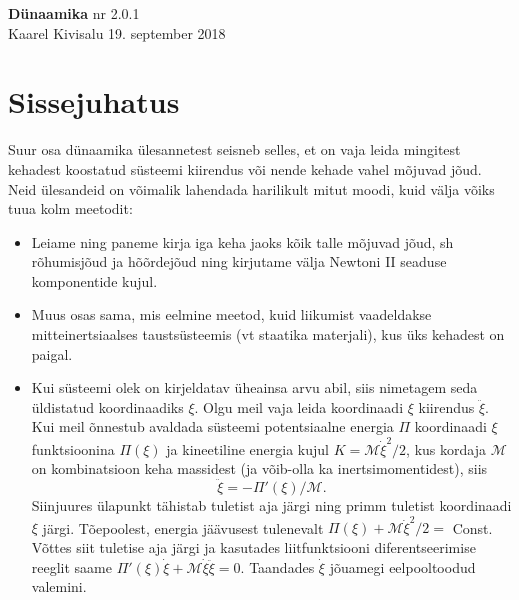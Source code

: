 \documentclass[a4paper,11pt,twocolumn]{article}
\begin{document}
{\huge \textbf{Dünaamika} \hfill \normalsize {nr 2.0.1}} \\
{Kaarel Kivisalu \hfill 19. september 2018}\\

\section*{Sissejuhatus}
Suur osa dünaamika ülesannetest seisneb selles, et on vaja leida mingitest kehadest koostatud süsteemi kiirendus või nende kehade vahel mõjuvad jõud. Neid ülesandeid on võimalik lahendada harilikult mitut moodi, kuid välja võiks tuua kolm meetodit:
\begin{itemize}
	\item Leiame ning paneme kirja iga keha jaoks kõik talle mõjuvad jõud, sh rõhumisjõud ja hõõrdejõud ning kirjutame välja Newtoni II seaduse komponentide kujul.
	\item Muus osas sama, mis eelmine meetod, kuid
	liikumist vaadeldakse mitteinertsiaalses taustsüsteemis
	(vt staatika materjali), kus üks kehadest on paigal.
	\item Kui süsteemi olek on kirjeldatav üheainsa arvu abil, siis nimetagem seda üldistatud koordinaadiks $ \xi $. Olgu meil vaja leida koordinaadi $ \xi $ kiirendus $ \ddot{\xi} $. Kui meil õnnestub avaldada süsteemi potentsiaalne energia $ \Pi $ koordinaadi $ \xi $ funktsioonina $ \Pi(\xi) $ ja kineetiline energia kujul $ K = \mathcal{M}\dot{\xi}^2/2 $, kus kordaja $ \mathcal{M} $ on kombinatsioon keha massidest (ja võib-olla ka inertsimomentidest), siis$$ \ddot{\xi}=−\Pi'(\xi)/\mathcal{M}.$$Siinjuures ülapunkt tähistab tuletist aja järgi ning primm tuletist koordinaadi $ \xi $ järgi. Tõepoolest, energia jäävusest tulenevalt $\Pi(\xi) + \mathcal{M}\dot{\xi}^2/2=$ Const. Võttes siit tuletise aja järgi 	ja kasutades liitfunktsiooni diferentseerimise reeglit saame $\Pi'(\xi)\dot{\xi} + \mathcal{M}\dot{\xi}\ddot{\xi}=0$. Taandades $ \dot{\xi} $ jõuamegi eelpooltoodud valemini.
\end{itemize}
\end{document}
